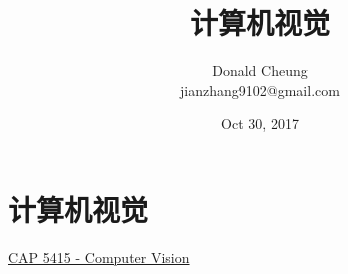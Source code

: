 \documentclass[10pt,a4paper]{ctexbook}
\begin{document}
    \setlength{\baselineskip}{20pt}
    \title{计算机视觉}
    \author{Donald Cheung\\jianzhang9102@gmail.com}
    \date{Oct 30, 2017}
    \maketitle
    \tableofcontents
\fi

\chapter{计算机视觉}


\href{http://crcv.ucf.edu/courses/CAP5415/Fall2012/index.php}{CAP 5415 - Computer Vision}


\ifx\mlbook\undefined
    
\end{document}
